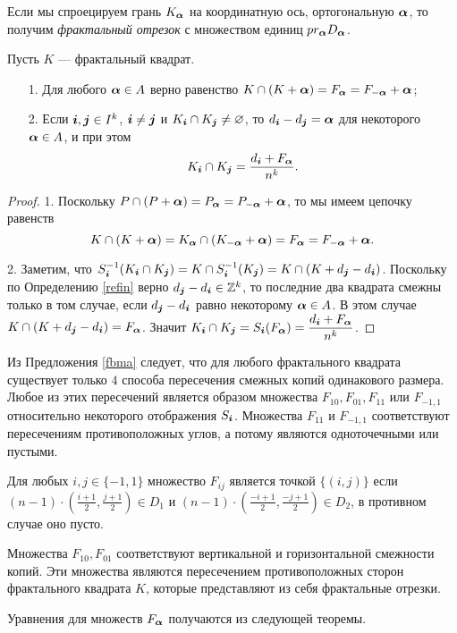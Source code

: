 Если мы спроецируем грань $K_{\bm{\alpha}}$ на координатную ось, ортогональную ${\bm{\alpha}}$, то получим {\em фрактальный отрезок} с множеством единиц $pr_{\bm{\alpha}} D_{\bm{\alpha}}$.


\begin{proposition}\label{fbma}
Пусть $K$ --- фрактальный квадрат.
\begin{itemize}[nolistsep]
\item[1.] Для любого ${\bm{\alpha}}\in A$ верно равенство $K\cap(K+{\bm{\alpha}})=F_{\bm{\alpha}}=F_{-{\bm{\alpha}}}+{\bm{\alpha}} $;
\item[2.] Если ${\bm{i}},{\bm{j}} \in I^k$, ${\bm{i}}\neq {\bm{j}}$ и $K_{\bm{i}}\cap K_{\bm{j}}\neq\varnothing$, то $d_{\bm{i}}-d_{\bm{j}}={\bm{\alpha}}$ для некоторого ${\bm{\alpha}}\in A$, и при этом 
$$K_{\bm{i}}\cap K_{\bm{j}}=\dfrac{d_{\bm{i}}+F_{\bm{\alpha}}}{n^k}.$$
\end{itemize}
\end{proposition}

\begin{proof}
1. Поскольку $P\cap (P+{\bm{\alpha}})=P_{\bm{\alpha}}=P_{-{\bm{\alpha}}}+{\bm{\alpha}}$, то мы имеем цепочку равенств 
$$K\cap(K+{\bm{\alpha}})= K_{\bm{\alpha}}\cap (K_{-{\bm{\alpha}}}+{\bm{\alpha}})=F_{\bm{\alpha}}=F_{-{\bm{\alpha}}}+{\bm{\alpha}}.$$

2. Заметим, что $S_{\bm{i}}^{-1}(K_{\bm{i}}\cap K_{\bm{j}})=K\cap S_{\bm{i}}^{-1}(K_{\bm{j}})=K\cap (K+d_{\bm{j}}-d_{\bm{i}})$. 
Поскольку по Определению \ref{refin} верно $d_{\bm{j}}-d_{\bm{i}}\in\mathbb{Z}^k$, то последние два квадрата смежны только в том случае, если $d_{\bm{j}}-d_{\bm{i}}$ равно некоторому ${\bm{\alpha}}\in A$. 
В этом случае $K\cap(K+d_{\bm{j}}-d_{\bm{i}})=F_{\bm{\alpha}}$.
Значит $K_{\bm{i}}\cap K_{\bm{j}}= S_{\bm{i}}(F_{\bm{\alpha}})= \dfrac{d_{\bm{i}}+F_{\bm{\alpha}}}{n^k}$. 
\end{proof}

Из Предложения \ref{fbma} следует, что для любого фрактального квадрата существует только $4$ способа пересечения смежных копий одинакового размера. 
Любое из этих пересечений является образом множества $F_{10}, F_{01}, F_{11}$ или $ F_{-1,1}$ относительно некоторого отображения $S_{\bm{i}}$. 
Множества $F_{11}$ и $ F_{-1,1}$ соответствуют пересечениям противоположных углов, а потому являются одноточечными или пустыми. 

Для любых $i,j\in\{-1,1\}$ множество $F_{ij}$ является точкой $\{(i,j)\}$ если $(n-1)\cdot\left(\frac{i+1}{2},\frac{j+1}{2}\right)\in D_1$ и $(n-1)\cdot\left(\frac{-i+1}{2},\frac{-j+1}{2}\right)\in D_2$, в противном случае оно пусто. 

Множества $F_{10}, F_{01}$ соответствуют вертикальной и горизонтальной смежности копий. 
Эти множества являются пересечением противоположных сторон фрактального квадрата $K$, которые представляют из себя фрактальные отрезки.

Уравнения для множеств $F_{\bm{\alpha}}$ получаются из следующей теоремы.

